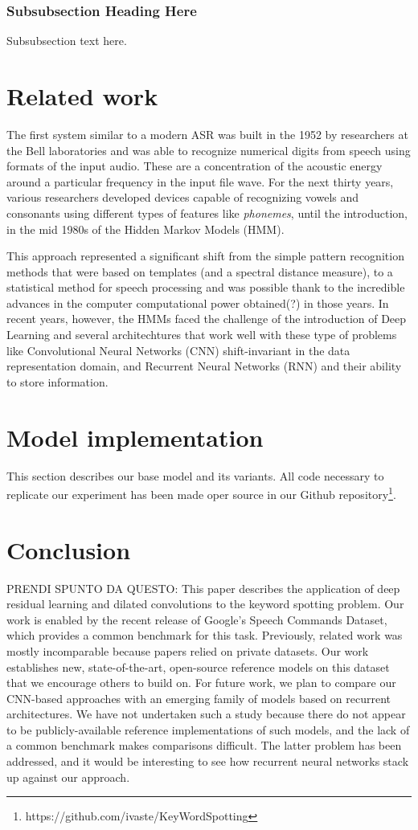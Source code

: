 \documentclass[conference]{IEEEtran}
\begin{document}
\subsubsection{Subsubsection Heading Here}
Subsubsection text here.

\section{Related work}
The first system similar to a modern ASR was built in the 1952 by researchers at the Bell laboratories and was able to recognize numerical digits from speech using formats of the input audio. These are a concentration of the acoustic energy around a particular frequency in the input file wave. For the next thirty years, various researchers developed devices capable of recognizing vowels and consonants using different types of features like \textit{phonemes}, until the introduction, in the mid 1980s of the Hidden Markov Models (HMM). 

This approach represented a significant shift from the simple pattern recognition methods that were based on templates (and a spectral distance measure), to a statistical method for speech processing and was possible thank to the incredible advances in the computer computational power obtained(?) in those years. In recent years, however, the HMMs faced the challenge of the introduction of Deep Learning and several architechtures that work well with these type of problems like Convolutional Neural Networks (CNN) shift-invariant in the data representation domain, and Recurrent Neural Networks (RNN) and their ability to store information.
\section{Model implementation}
This section describes our base model and its variants. All code necessary to replicate our experiment has been made oper source in our Github repository\footnote{https://github.com/ivaste/KeyWordSpotting}.
\section{Conclusion}
PRENDI SPUNTO DA QUESTO: This paper describes the application of deep residual learning and dilated convolutions to the keyword spotting problem. Our work is enabled by the recent release of Google’s Speech Commands Dataset, which provides a common benchmark for this task. Previously, related work was mostly incomparable because papers relied on private datasets. Our work establishes new, state-of-the-art, open-source reference models on this dataset that we encourage others to build on. For future work, we plan to compare our CNN-based approaches with an emerging family of models based on recurrent architectures. We have not undertaken such a study because there do not appear to be publicly-available reference implementations of such models, and the lack of a common benchmark makes comparisons difficult. The latter problem has been addressed, and it would be interesting to see how
recurrent neural networks stack up against our approach.
\end{document}
